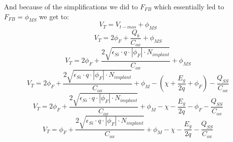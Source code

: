 And because of the simplifications we did to $F_{FB}$ which essentially led to $F_{FB}=\phi_{MS}$ we get to:
\begin{equation}
V_T = V_{t-mos} + \phi_{MS}
\end{equation}
\begin{equation}
V_T = 2 \phi_F + \frac{Q_b}{C_{ox}} + \phi_{MS}
\end{equation}
\begin{equation}
V_T = 2 \phi_F + \frac{2 \sqrt{\epsilon_{Si}\cdot q\cdot \left| \phi_F \right| \cdot N_{implant} }}{C_{ox}} + \phi_{MS}
\end{equation}
\begin{equation}
V_T = 2 \phi_F + \frac{2 \sqrt{\epsilon_{Si}\cdot q\cdot \left| \phi_F \right| \cdot N_{implant} }}{C_{ox}} + \phi_{M} -  \left(\chi + \frac{E_g}{2 q} + \phi_F \right) - \frac{Q_{SS}}{C_{ox}}
\end{equation}
\begin{equation}
V_T = 2 \phi_F + \frac{2 \sqrt{\epsilon_{Si}\cdot q\cdot \left| \phi_F \right| \cdot N_{implant} }}{C_{ox}} + \phi_{M} -  \chi - \frac{E_g}{2 q} - \phi_F - \frac{Q_{SS}}{C_{ox}}
\end{equation}
\begin{equation}
V_T = \phi_F + \frac{2 \sqrt{\epsilon_{Si}\cdot q\cdot \left| \phi_F \right| \cdot N_{implant} }}{C_{ox}} + \phi_{M} -  \chi - \frac{E_g}{2 q} - \frac{Q_{SS}}{C_{ox}}
\end{equation}

